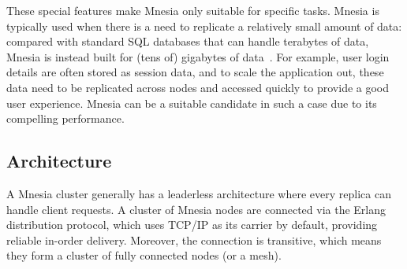 These special features make Mnesia only suitable for specific tasks.
Mnesia is typically used when there is a need to replicate a 
relatively small amount of data: compared with standard SQL databases that can
handle terabytes of data, Mnesia is instead built for (tens of) gigabytes of 
data~\cite{hebert2013LYSE}.
For example, user login details are often stored as session data, and to 
scale the application out, these data need to be replicated across
nodes and accessed quickly to provide a good user experience. 
Mnesia can be a suitable candidate in such a case due to its compelling performance.

\subsection{Architecture} \label{subsec:bg mnesia arch}


A Mnesia cluster generally has a leaderless architecture where every replica can 
handle client requests. A cluster of Mnesia nodes are connected via the
Erlang distribution protocol, which uses TCP/IP as its carrier by default, providing
reliable in-order delivery. Moreover, the connection is transitive, 
which means they form a cluster of fully connected nodes (or a mesh).

